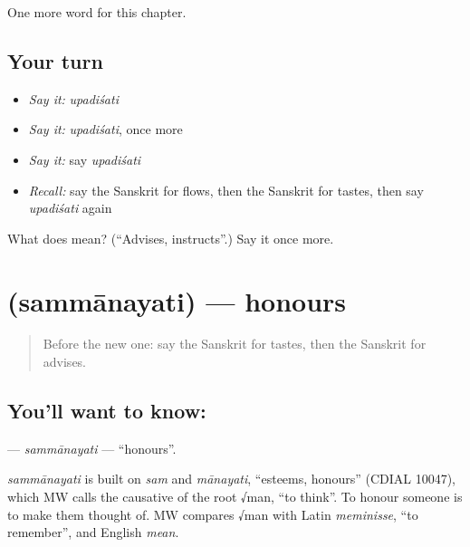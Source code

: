 \begin{grammarlens}[title={What you've built}]
One more word for this chapter.
\end{grammarlens}

\subsection*{Your turn}
\begin{itemize}
\raggedright
  \item \emph{Say it:} \emph{upadiśati}
  \item \emph{Say it:} \emph{upadiśati}, once more
  \item \emph{Say it:} say \emph{upadiśati}
  \item \emph{Recall:} say the Sanskrit for flows, then the Sanskrit for tastes, then say \emph{upadiśati} again
\end{itemize}

\begin{tcolorbox}[breakable,colback=teal!4,colframe=teal!35!black,title={Before you move on}]
What does  mean? (\textquotedblleft{}Advises, instructs\textquotedblright{}.) Say it once more.
\end{tcolorbox}
\section[\texorpdfstring{\sk{सम्मानयति} (sammānayati)}{सम्मानयति (sammānayati)}]{ (sammānayati) — honours}

\label{lesson:SA-C207-sammanayati}



\begin{quote}
Before the new one: say the Sanskrit for tastes, then the Sanskrit for advises.
\end{quote}

\subsection*{You'll want to know: }
\textbf{} — \emph{sammānayati} — \textquotedblleft{}honours\textquotedblright{}.

\begin{cousinweb}
\emph{sammānayati} is built on \emph{sam} and \emph{mānayati}, \textquotedblleft{}esteems, honours\textquotedblright{} (CDIAL 10047), which MW calls the causative of the root √man, \textquotedblleft{}to think\textquotedblright{}. To honour someone is to make them thought of. MW compares √man with Latin \emph{meminisse}, \textquotedblleft{}to remember\textquotedblright{}, and English \emph{mean}.
\end{cousinweb}

